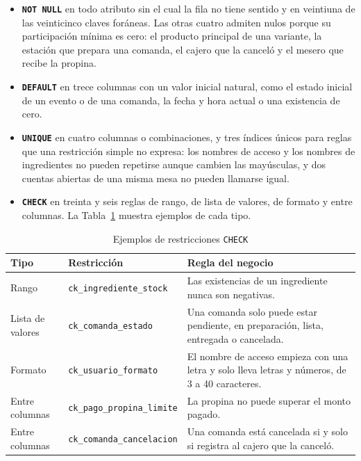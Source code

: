 \begin{itemize}
    \item \textbf{\texttt{NOT NULL}} en todo atributo sin el cual la fila no tiene sentido y en veintiuna de las veinticinco claves foráneas. Las otras cuatro admiten nulos porque su participación mínima es cero: el producto principal de una variante, la estación que prepara una comanda, el cajero que la canceló y el mesero que recibe la propina.
    \item \textbf{\texttt{DEFAULT}} en trece columnas con un valor inicial natural, como el estado inicial de un evento o de una comanda, la fecha y hora actual o una existencia de cero.
    \item \textbf{\texttt{UNIQUE}} en cuatro columnas o combinaciones, y tres índices únicos para reglas que una restricción simple no expresa: los nombres de acceso y los nombres de ingredientes no pueden repetirse aunque cambien las mayúsculas, y dos cuentas abiertas de una misma mesa no pueden llamarse igual.
    \item \textbf{\texttt{CHECK}} en treinta y seis reglas de rango, de lista de valores, de formato y entre columnas. La Tabla~\ref{tab:check} muestra ejemplos de cada tipo.
\end{itemize}

\begin{table}[H]
    \centering
    \small
    \begin{tabularx}{\textwidth}
        {
            >{\RaggedRight\arraybackslash}p{2.4cm}
            >{\RaggedRight\arraybackslash}p{5.4cm}
            >{\RaggedRight\arraybackslash}X
        }
        \toprule
        \textbf{Tipo} & \textbf{Restricción} & \textbf{Regla del negocio} \\
        \midrule
        Rango & \texttt{ck\_ingrediente\_stock} & Las existencias de un ingrediente nunca son negativas. \\
        Lista de valores & \texttt{ck\_comanda\_estado} & Una comanda solo puede estar pendiente, en preparación, lista, entregada o cancelada. \\
        Formato & \texttt{ck\_usuario\_formato} & El nombre de acceso empieza con una letra y solo lleva letras y números, de 3 a 40 caracteres. \\
        Entre columnas & \texttt{ck\_pago\_propina\_limite} & La propina no puede superar el monto pagado. \\
        Entre columnas & \texttt{ck\_comanda\_cancelacion} & Una comanda está cancelada si y solo si registra al cajero que la canceló. \\
        \bottomrule
    \end{tabularx}
    \captionsetup{labelfont=bf, textfont=it, labelsep=newline, justification=raggedright, singlelinecheck=false}
    \caption{Ejemplos de restricciones \texttt{CHECK}}
    \label{tab:check}
\end{table}

